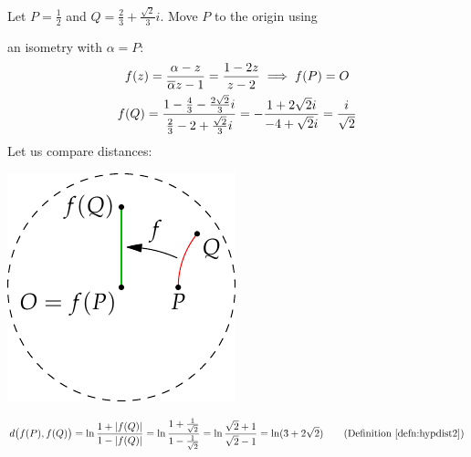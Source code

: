 \begin{example}{}{}
	Let $P=\frac 12$ and $Q=\frac 23+\frac{\sqrt 2}3i$. Move $P$ to the origin using\par
	\begin{minipage}[t]{0.74\linewidth}\vspace{-8pt}
		an isometry\footnotemark{} with $\alpha=P$:
		\begin{gather*}
 			f(z)=\frac{\alpha-z}{\overline{\alpha} z-1} =\frac{1-2z}{z-2} \implies f(P)=O\\
 			f(Q)=\frac{1-\frac 43-\frac{2\sqrt 2}3i}{\frac 23-2+\frac{\sqrt 2}3i} =-\frac{1+2\sqrt 2i}{-4+\sqrt 2i} =\frac{i}{\sqrt 2}
		\end{gather*}
		Let us compare distances:
	\end{minipage}
	\hfill
	\begin{minipage}[t]{0.25\linewidth}\vspace{-20pt}
		\flushright\includegraphics{calc-triangle3}
	\end{minipage}\par\vspace{-4pt}
	\begin{gather*}
		d\bigl(f(P),f(Q)\bigr) = \ln\frac{1+\nm{f(Q)}}{1-\nm{f(Q)}} =\ln\frac{1+\frac 1{\sqrt 2}}{1-\frac 1{\sqrt 2}}=\ln\frac{\sqrt 2+1}{\sqrt 2-1}=\ln(3+2\sqrt 2) \tag{Definition \ref{defn:hypdist2}}\\
		\begin{aligned}

\end{aligned}
\end{gather*}
\end{example}
